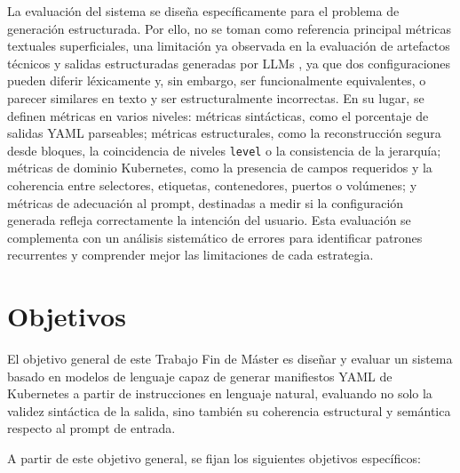 La evaluación del sistema se diseña específicamente para el problema de generación estructurada. Por ello, no se toman como referencia principal métricas textuales superficiales, una limitación ya observada en la evaluación de artefactos técnicos y salidas estructuradas generadas por LLMs \citep{chen2021evaluating, xu2024cloudevalyaml, yang2025structeval}, ya que dos configuraciones pueden diferir léxicamente y, sin embargo,
ser funcionalmente equivalentes, o parecer similares en texto y ser estructuralmente incorrectas. En su lugar, se definen métricas en varios niveles: métricas sintácticas, como el porcentaje de salidas YAML parseables; métricas estructurales, como la
reconstrucción segura desde bloques, la coincidencia de niveles \texttt{level} o la consistencia de la jerarquía; métricas de dominio Kubernetes, como la presencia de campos requeridos y la coherencia entre selectores, etiquetas, contenedores, puertos 
o volúmenes; y métricas de adecuación al prompt, destinadas a medir si la configuración generada refleja correctamente la intención del usuario. Esta evaluación se complementa con un análisis sistemático de errores para identificar patrones recurrentes
y comprender mejor las limitaciones de cada estrategia.

\section{Objetivos}

El objetivo general de este Trabajo Fin de Máster es diseñar y evaluar un sistema basado en modelos de lenguaje capaz de generar manifiestos YAML de Kubernetes a partir de
instrucciones en lenguaje natural, evaluando no solo la validez sintáctica 
de la salida, sino también su coherencia estructural y semántica respecto al prompt de entrada.

A partir de este objetivo general, se fijan los siguientes objetivos específicos:

